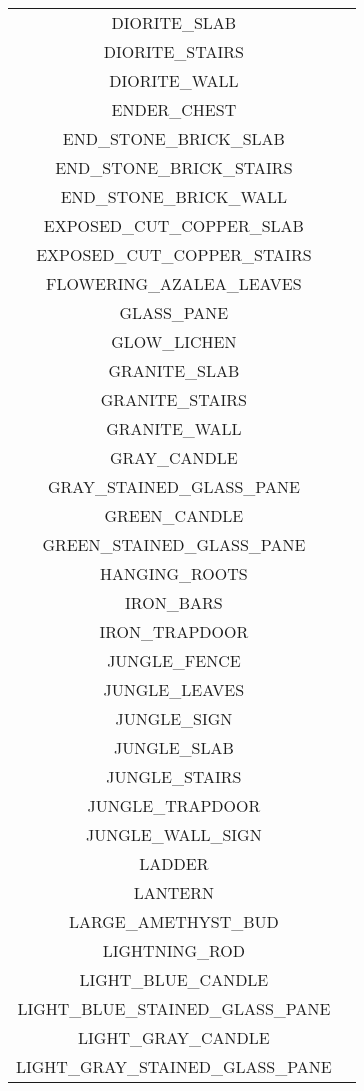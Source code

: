 \begin{longtable}{ |c|c| }
	DIORITE\_SLAB & \xmark \\
	DIORITE\_STAIRS & \xmark \\
	DIORITE\_WALL & \xmark \\
	ENDER\_CHEST & \xmark \\
	END\_STONE\_BRICK\_SLAB & \xmark \\
	END\_STONE\_BRICK\_STAIRS & \xmark \\
	END\_STONE\_BRICK\_WALL & \xmark \\
	EXPOSED\_CUT\_COPPER\_SLAB & \xmark \\
	EXPOSED\_CUT\_COPPER\_STAIRS & \xmark \\
	FLOWERING\_AZALEA\_LEAVES & \xmark \\
	GLASS\_PANE & \xmark \\
	GLOW\_LICHEN & \xmark \\
	GRANITE\_SLAB & \xmark \\
	GRANITE\_STAIRS & \xmark \\
	GRANITE\_WALL & \xmark \\
	GRAY\_CANDLE & \xmark \\
	GRAY\_STAINED\_GLASS\_PANE & \xmark \\
	GREEN\_CANDLE & \xmark \\
	GREEN\_STAINED\_GLASS\_PANE & \xmark \\
	HANGING\_ROOTS & \xmark \\
	IRON\_BARS & \xmark \\
	IRON\_TRAPDOOR & \xmark \\
	JUNGLE\_FENCE & \xmark \\
	JUNGLE\_LEAVES & \xmark \\
	JUNGLE\_SIGN & \xmark \\
	JUNGLE\_SLAB & \xmark \\
	JUNGLE\_STAIRS & \xmark \\
	JUNGLE\_TRAPDOOR & \xmark \\
	JUNGLE\_WALL\_SIGN & \xmark \\
	LADDER & \xmark \\
	LANTERN & \xmark \\
	LARGE\_AMETHYST\_BUD & \xmark \\
	LIGHTNING\_ROD & \xmark \\
	LIGHT\_BLUE\_CANDLE & \xmark \\
	LIGHT\_BLUE\_STAINED\_GLASS\_PANE & \xmark \\
	LIGHT\_GRAY\_CANDLE & \xmark \\
	LIGHT\_GRAY\_STAINED\_GLASS\_PANE & \xmark \\

\end{longtable}
